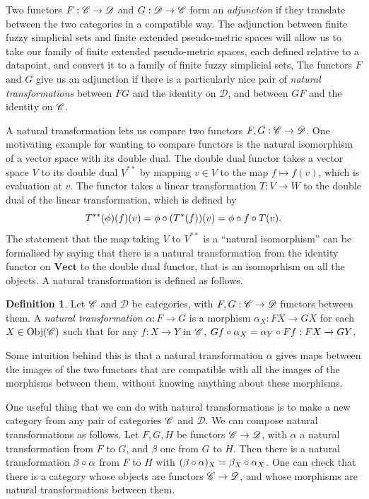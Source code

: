 \documentclass[a4paper,12pt,leqno]{article} \usepackage{amsmath}
\newcommand{\curD}{\mathscr{D}} \newcommand{\curI}{\mathscr{I}}
\newcommand{\Obj}{\ensuremath{\operatorname{Obj}}}
\theoremstyle{definition}
\newtheorem{defn}{Definition}
\begin{document}
Two functors $F: \curC\to\curD$ and $G: \curD\to\curC$ form an
\emph{adjunction} if they translate between the two categories in a compatible
way.
The adjunction between finite fuzzy simplicial sets and finite extended
pseudo-metric spaces will allow us to take our family of finite extended
pseudo-metric spaces, each defined relative to a datapoint, and convert it to
a family of finite fuzzy simplicial sets, 
The functors $F$ and $G$ give us an adjunction if there is a particularly nice
pair of \emph{natural transformations} between $FG$ and the identity on
$\curD$, and between $GF$ and the identity on $\mathscr{C}$.

A natural transformation lets us compare two functors $F, G:
\curC\to\curD$.
One motivating example for wanting to compare functors is the natural
isomorphism of a vector space with its double dual.
The double dual functor takes a vector space $V$ to its double dual $V^{**}$ by
mapping $v\in V$ to the map $f\mapsto f(v)$, which is evaluation at $v$.
The functor takes a linear transformation $T: V\to W$ to the double dual of the
linear transformation, which is defined by
$$T^{**}(\phi)(f)(v) = \phi\circ (T^*(f))(v) = \phi\circ f\circ T(v).$$
The statement that the map taking $V$ to $V^{**}$ is a ``natural isomorphism'' can
be formalised by saying that there is a natural transformation from
the identity functor on $\textbf{Vect}$ to the double dual functor, that is an
isomoprhism on all the objects.
A natural transformation is defined as follows.

\begin{defn}
  Let $\mathscr{C}$ and $\curD$ be categories, with $F, G: \curC\to \curD$ functors
  between them.
  A \emph{natural transformation} $\alpha: F\to G$ is a morphism
  $\alpha_X: FX\to GX$ for each $X\in \Obj(\curC)$ such that for any
  $f: X\to Y$ in $\mathscr{C}$, $Gf\circ \alpha_X = \alpha_Y\circ Ff: FX\to GY$.
\end{defn}

Some intuition behind this is that a natural transformation $\alpha$ gives maps
between the images of the two functors that are compatible with all the
images of the morphisms between them, without knowing anything about these
morphisms. 

One useful thing that we can do with natural transformations is to make a new
category from any pair of categories $\mathscr{C}$ and $\curD$.
We can compose natural transformations as follows.
Let $F, G, H$ be functors $\curC\to \curD$, with $\alpha$ a natural
transformation from $F$ to $G$, and $\beta$ one from $G$ to $H$.
Then there is a natural transformation $\beta\circ\alpha$ from $F$ to $H$ with
$(\beta\circ\alpha)_X = \beta_X\circ\alpha_X$.
One can check that there is a category whose objects are functors
$\curC\to\curD$, and whose morphisms are natural transformations between them.
\end{document}
